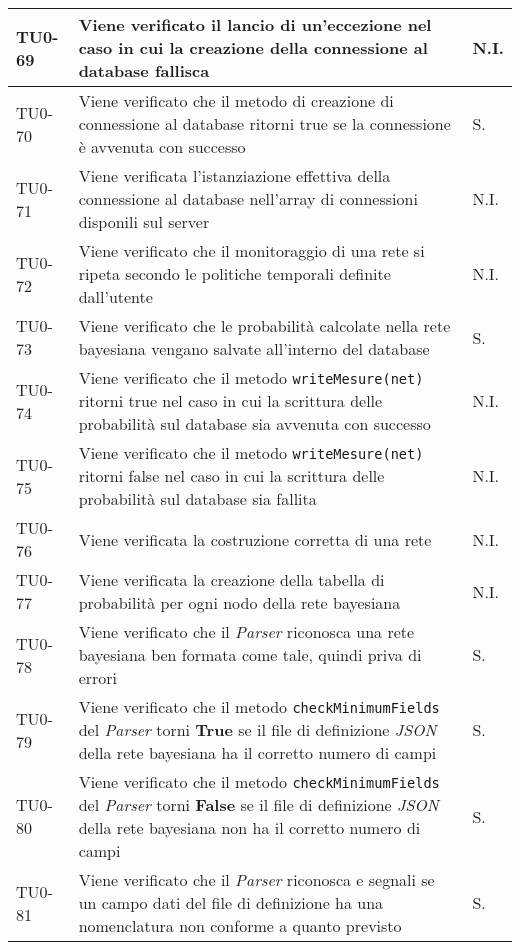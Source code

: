 \begin{longtable}{|C{.15\textwidth}|m{.66\textwidth}|C{.10\textwidth}|}
\hline
{} TU0-69 & Viene verificato il lancio di un'eccezione nel caso in cui la creazione della connessione al database fallisca & N.I. \\ 
\hline
TU0-70 & Viene verificato che il metodo di creazione di connessione al database ritorni true se la connessione è avvenuta con successo & S. \\ 
\hline 
{} TU0-71 & Viene verificata l'istanziazione effettiva della connessione al database nell'array di connessioni disponili sul server & N.I. \\ 
\hline 
TU0-72 & Viene verificato che il monitoraggio di una rete si ripeta secondo le politiche temporali definite dall'utente & N.I. \\ 
\hline 
{} TU0-73 & Viene verificato che le probabilità calcolate nella rete bayesiana vengano salvate all'interno del database  & S. \\ 
\hline 
TU0-74 & Viene verificato che il metodo \texttt{writeMesure(net)}  ritorni true nel caso in cui la scrittura delle probabilità sul database sia avvenuta con successo & N.I. \\
\hline
{}TU0-75 & Viene verificato che il metodo \texttt{writeMesure(net)} ritorni false nel caso in cui la scrittura delle probabilità sul database sia fallita & N.I. \\ 
\hline
TU0-76 & Viene verificata la costruzione corretta di una rete & N.I.  \\ 
\hline 
{}TU0-77 & Viene verificata la creazione della tabella di probabilità per ogni nodo della rete bayesiana & N.I. \\ 
\hline
TU0-78 & Viene verificato che il \textit{Parser} riconosca una rete bayesiana ben formata come tale, quindi priva di errori & S. \\
\hline
{}TU0-79 & Viene verificato che il metodo \texttt{checkMinimumFields} del \textit{Parser} torni \textbf{True} se il file di definizione \textit{JSON} della rete bayesiana ha il corretto numero di campi & S.\\
\hline
TU0-80 & Viene verificato che il metodo \texttt{checkMinimumFields} del \textit{Parser} torni \textbf{False} se il file di definizione \textit{JSON} della rete bayesiana non ha il corretto numero di campi & S.\\
\hline
{}TU0-81 & Viene verificato che il \textit{Parser} riconosca e segnali se un campo dati del file di definizione ha una nomenclatura non conforme a quanto previsto & S.\\

\end{longtable}
